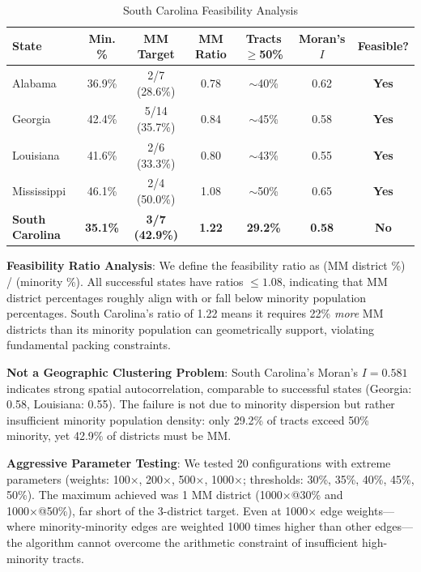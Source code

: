 \begin{table}[htbp]
\centering
\caption{South Carolina Feasibility Analysis}
\label{tab:sc-feasibility}
\begin{tabular}{lcccccc}
\toprule
\textbf{State} & \textbf{Min. \%} & \textbf{MM Target} & \textbf{MM Ratio} & \textbf{Tracts $\geq$50\%} & \textbf{Moran's $I$} & \textbf{Feasible?} \\
\midrule
Alabama        & 36.9\% & 2/7 (28.6\%) & 0.78 & $\sim$40\% & 0.62 & \textbf{Yes} \\
Georgia        & 42.4\% & 5/14 (35.7\%) & 0.84 & $\sim$45\% & 0.58 & \textbf{Yes} \\
Louisiana      & 41.6\% & 2/6 (33.3\%) & 0.80 & $\sim$43\% & 0.55 & \textbf{Yes} \\
Mississippi    & 46.1\% & 2/4 (50.0\%) & 1.08 & $\sim$50\% & 0.65 & \textbf{Yes} \\
\textbf{South Carolina} & \textbf{35.1\%} & \textbf{3/7 (42.9\%)} & \textbf{1.22} & \textbf{29.2\%} & \textbf{0.58} & \textbf{No} \\
\bottomrule
\end{tabular}
\end{table}

\textbf{Feasibility Ratio Analysis}: We define the feasibility ratio as (MM district \%) / (minority \%). All successful states have ratios $\leq 1.08$, indicating that MM district percentages roughly align with or fall below minority population percentages. South Carolina's ratio of 1.22 means it requires 22\% \emph{more} MM districts than its minority population can geometrically support, violating fundamental packing constraints.

\textbf{Not a Geographic Clustering Problem}: South Carolina's Moran's $I = 0.581$ indicates strong spatial autocorrelation, comparable to successful states (Georgia: 0.58, Louisiana: 0.55). The failure is not due to minority dispersion but rather insufficient minority population density: only 29.2\% of tracts exceed 50\% minority, yet 42.9\% of districts must be MM.

\textbf{Aggressive Parameter Testing}: We tested 20 configurations with extreme parameters (weights: 100×, 200×, 500×, 1000×; thresholds: 30\%, 35\%, 40\%, 45\%, 50\%). The maximum achieved was 1 MM district (1000×@30\% and 1000×@50\%), far short of the 3-district target. Even at 1000× edge weights---where minority-minority edges are weighted 1000 times higher than other edges---the algorithm cannot overcome the arithmetic constraint of insufficient high-minority tracts.


